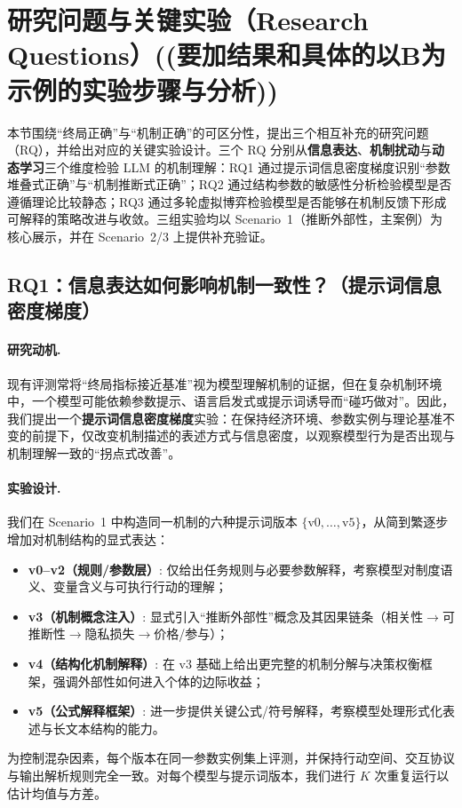 \section{研究问题与关键实验（Research Questions）((要加结果和具体的以B为示例的实验步骤与分析))}
\label{sec:rq}

本节围绕“终局正确”与“机制正确”的可区分性，提出三个相互补充的研究问题（RQ），并给出对应的关键实验设计。三个 RQ 分别从\textbf{信息表达}、\textbf{机制扰动}与\textbf{动态学习}三个维度检验 LLM 的机制理解：RQ1 通过提示词信息密度梯度识别“参数堆叠式正确”与“机制推断式正确”；RQ2 通过结构参数的敏感性分析检验模型是否遵循理论比较静态；RQ3 通过多轮虚拟博弈检验模型是否能够在机制反馈下形成可解释的策略改进与收敛。三组实验均以 Scenario~1（推断外部性，主案例）为核心展示，并在 Scenario~2/3 上提供补充验证。

\subsection{RQ1：信息表达如何影响机制一致性？（提示词信息密度梯度）}
\label{subsec:rq1}

\paragraph{研究动机.}
现有评测常将“终局指标接近基准”视为模型理解机制的证据，但在复杂机制环境中，一个模型可能依赖参数提示、语言启发式或提示词诱导而“碰巧做对”。因此，我们提出一个\textbf{提示词信息密度梯度}实验：在保持经济环境、参数实例与理论基准不变的前提下，仅改变机制描述的表述方式与信息密度，以观察模型行为是否出现与机制理解一致的“拐点式改善”。

\paragraph{实验设计.}
我们在 Scenario~1 中构造同一机制的六种提示词版本 $\{\mathrm{v0},\ldots,\mathrm{v5}\}$，从简到繁逐步增加对机制结构的显式表达：
\begin{itemize}
  \item \textbf{v0--v2（规则/参数层）}: 仅给出任务规则与必要参数解释，考察模型对制度语义、变量含义与可执行行动的理解；
  \item \textbf{v3（机制概念注入）}: 显式引入“推断外部性”概念及其因果链条（相关性$\rightarrow$可推断性$\rightarrow$隐私损失$\rightarrow$价格/参与）；
  \item \textbf{v4（结构化机制解释）}: 在 v3 基础上给出更完整的机制分解与决策权衡框架，强调外部性如何进入个体的边际收益；
  \item \textbf{v5（公式解释框架）}: 进一步提供关键公式/符号解释，考察模型处理形式化表述与长文本结构的能力。
\end{itemize}
为控制混杂因素，每个版本在同一参数实例集上评测，并保持行动空间、交互协议与输出解析规则完全一致。对每个模型与提示词版本，我们进行 $K$ 次重复运行以估计均值与方差。

